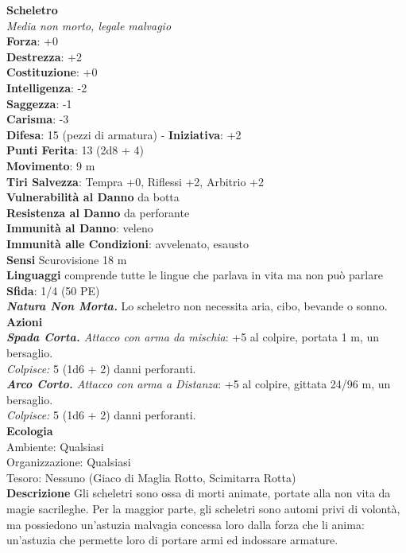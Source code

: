 \begin{multicols}{2}
\medskip\textbf{Scheletro}\\
\emph{Media non morto, legale malvagio}\\
\textbf{Forza}: +0\\
\textbf{Destrezza}: +2\\
\textbf{Costituzione}: +0\\
\textbf{Intelligenza}: -2\\
\textbf{Saggezza}: -1\\
\textbf{Carisma}: -3\\
\textbf{Difesa}: 15 (pezzi di armatura) - \textbf{Iniziativa}: +2\\
\textbf{Punti Ferita}: 13 (2d8 + 4)\\
\textbf{Movimento}: 9 m\\
\textbf{Tiri Salvezza}: Tempra +0, Riflessi +2, Arbitrio +2\\
\textbf{Vulnerabilità al Danno} da botta\\
\textbf{Resistenza al Danno} da perforante\\
\textbf{Immunità al Danno}: veleno\\
\textbf{Immunità alle Condizioni}: avvelenato, esausto\\
\textbf{Sensi} Scurovisione 18 m\\
\textbf{Linguaggi} comprende tutte le lingue che parlava in vita ma non può parlare\\
\textbf{Sfida}: 1/4 (50 PE)\smallskip\\
\emph{\textbf{Natura Non Morta.}} Lo scheletro non necessita aria, cibo, bevande o sonno.\\
\smallskip\textbf{Azioni}\\
\emph{\textbf{Spada Corta.} Attacco con arma da mischia}: +5 al colpire, portata 1 m, un bersaglio.\\
\emph{Colpisce:} 5 (1d6 + 2) danni perforanti.\\
\emph{\textbf{Arco Corto.} Attacco con arma a Distanza}: +5 al colpire, gittata 24/96 m, un bersaglio.\\
\emph{Colpisce:} 5 (1d6 + 2) danni perforanti.\\
\textbf{Ecologia}\\
Ambiente: Qualsiasi\\
Organizzazione: Qualsiasi\\
Tesoro: Nessuno (Giaco di Maglia Rotto, Scimitarra Rotta)\\
\textbf{Descrizione}
Gli scheletri sono ossa di morti animate, portate alla non vita da magie sacrileghe. Per la maggior parte, gli scheletri sono automi privi di volontà, ma possiedono un’astuzia malvagia concessa loro dalla forza che li anima: un’astuzia che permette loro di portare armi ed indossare armature.\\



\end{multicols}
